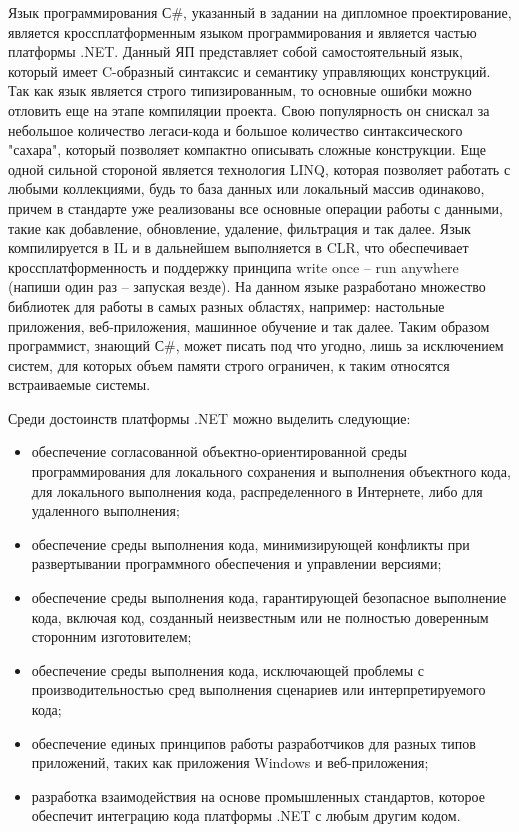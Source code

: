 Язык программирования С\#, указанный в задании на дипломное проектирование, является кроссплатформенным языком программирования и является частью платформы .NET. Данный ЯП представляет собой самостоятельный язык, 
который имеет C-образный синтаксис и семантику управляющих конструкций. Так как язык является строго типизированным, то основные ошибки можно отловить еще на этапе компиляции проекта.
Свою популярность он снискал за небольшое количество легаси-кода и большое количество синтаксического "сахара", который позволяет компактно описывать сложные конструкции.
Еще одной сильной стороной является технология LINQ, которая позволяет работать с любыми коллекциями, будь то база данных или локальный массив одинаково, причем в стандарте уже
реализованы все основные операции работы с данными, такие как добавление, обновление, удаление, фильтрация и так далее. Язык компилируется в IL и в дальнейшем выполняется в 
CLR, что обеспечивает кроссплатформенность и поддержку принципа write once -- run anywhere (напиши один раз -- запуская везде).
На данном языке разработано множество библиотек для работы в самых разных областях, например: настольные приложения, веб-приложения, машинное обучение и так далее. Таким
образом программист, знающий С\#, может писать под что угодно, лишь за исключением систем, для которых объем памяти строго ограничен, к таким относятся встраиваемые системы.

Среди достоинств платформы .NET можно выделить следующие:

\begin{itemize}
	\item обеспечение согласованной объектно-ориентированной среды программирования для локального сохранения и выполнения объектного кода, для
    локального выполнения кода, распределенного в Интернете, либо для удаленного выполнения;
	\item обеспечение среды выполнения кода, минимизирующей конфликты
    при развертывании программного обеспечения и управлении версиями;
	\item обеспечение среды выполнения кода, гарантирующей безопасное выполнение кода, включая код, созданный неизвестным или не полностью доверенным сторонним изготовителем;
	\item обеспечение среды выполнения кода, исключающей проблемы с производительностью сред выполнения сценариев или интерпретируемого кода;
	\item обеспечение единых принципов работы разработчиков для разных типов приложений, таких как приложения Windows и веб-приложения;
	\item разработка взаимодействия на основе промышленных стандартов, которое обеспечит интеграцию кода платформы .NET с любым другим
    кодом.
\end{itemize} 

